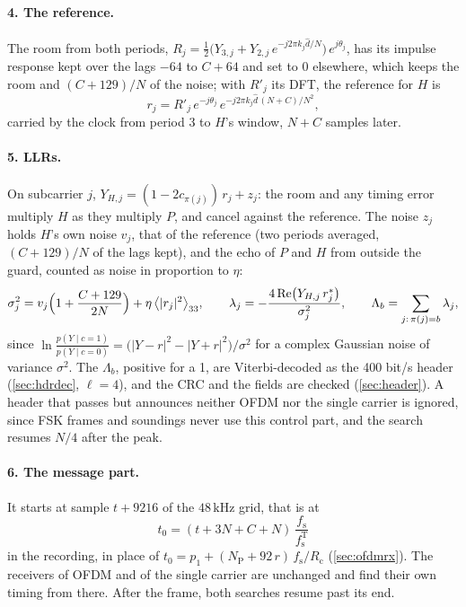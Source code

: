 \documentclass[11pt,a4paper]{article}
\newcommand{\kHz}{\,\mathrm{kHz}}
\newcommand{\fsT}{f_{\mathrm{s}}^{\mathrm{T}}}
\newcommand{\fs}{f_{\mathrm{s}}}
\newcommand{\Rc}{R_{\mathrm{c}}}
\newcommand{\NP}{N_{\mathrm{P}}}
\theoremstyle{remark}
\begin{document}
\paragraph{4. The reference.}
The room from both periods, $R_j = \tfrac12\bigl(Y_{3,j} + Y_{2,j}\, e^{-j 2\pi k_j \hat d/N}\bigr)\, e^{j\theta_j}$, has its impulse response kept over the lags $-64$ to $C + 64$ and set to 0 elsewhere, which keeps the room and $(C + 129)/N$ of the noise; with $R'_j$ its DFT, the reference for $H$ is
\begin{equation}
r_j = R'_j\, e^{-j\theta_j}\, e^{-j 2\pi k_j \hat d\, (N + C)/N^2},
\label{eq:c6ref}
\end{equation}
carried by the clock from period 3 to $H$'s window, $N + C$ samples later.

\paragraph{5. LLRs.}
On subcarrier $j$, $Y_{H,j} = (1 - 2 c_{\pi(j)})\, r_j + z_j$: the room and any timing error multiply $H$ as they multiply $P$, and cancel against the reference. The noise $z_j$ holds $H$'s own noise $v_j$, that of the reference (two periods averaged, $(C + 129)/N$ of the lags kept), and the echo of $P$ and $H$ from outside the guard, counted as noise in proportion to $\eta$:
\begin{equation}
\sigma_j^2 = v_j \Bigl(1 + \frac{C + 129}{2N}\Bigr) + \eta\, \bigl\langle |r_j|^2 \bigr\rangle_{33}, \qquad
\lambda_j = -\frac{4 \operatorname{Re}\bigl(Y_{H,j}\, r_j^*\bigr)}{\sigma_j^2}, \qquad
\Lambda_b = \sum_{j:\, \pi(j) = b} \lambda_j,
\label{eq:c6llr}
\end{equation}
since $\ln \frac{p(Y \mid c = 1)}{p(Y \mid c = 0)} = \bigl(|Y - r|^2 - |Y + r|^2\bigr)/\sigma^2$ for a complex Gaussian noise of variance $\sigma^2$. The $\Lambda_b$, positive for a 1, are Viterbi-decoded as the 400 bit/s header (\cref{sec:hdrdec}, $\ell = 4$), and the CRC and the fields are checked (\cref{sec:header}). A header that passes but announces neither OFDM nor the single carrier is ignored, since FSK frames and soundings never use this control part, and the search resumes $N/4$ after the peak.

\paragraph{6. The message part.}
It starts at sample $t + 9216$ of the $48\kHz$ grid, that is at
\begin{equation}
t_0 = (t + 3N + C + N)\, \frac{\fs}{\fsT}
\label{eq:c6t0}
\end{equation}
in the recording, in place of $t_0 = p_1 + (\NP + 92\,r)\,\fs/\Rc$ (\cref{sec:ofdmrx}). The receivers of OFDM and of the single carrier are unchanged and find their own timing from there. After the frame, both searches resume past its end.
\end{document}
